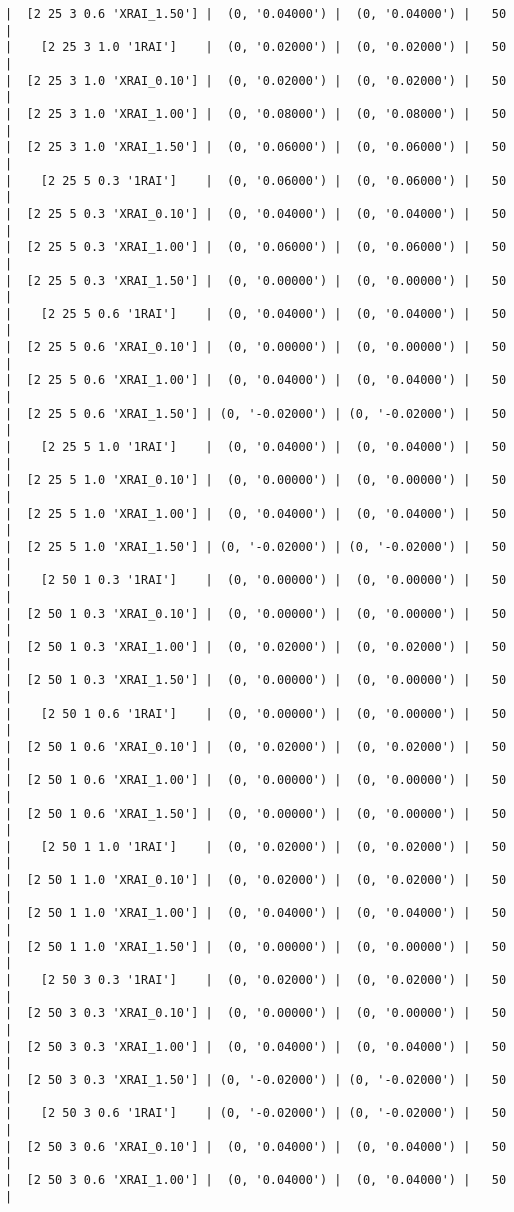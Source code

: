 \documentclass{article}
\begin{document}
\begin{verbatim}
|  [2 25 3 0.6 'XRAI_1.50'] |  (0, '0.04000') |  (0, '0.04000') |   50  |
|    [2 25 3 1.0 '1RAI']    |  (0, '0.02000') |  (0, '0.02000') |   50  |
|  [2 25 3 1.0 'XRAI_0.10'] |  (0, '0.02000') |  (0, '0.02000') |   50  |
|  [2 25 3 1.0 'XRAI_1.00'] |  (0, '0.08000') |  (0, '0.08000') |   50  |
|  [2 25 3 1.0 'XRAI_1.50'] |  (0, '0.06000') |  (0, '0.06000') |   50  |
|    [2 25 5 0.3 '1RAI']    |  (0, '0.06000') |  (0, '0.06000') |   50  |
|  [2 25 5 0.3 'XRAI_0.10'] |  (0, '0.04000') |  (0, '0.04000') |   50  |
|  [2 25 5 0.3 'XRAI_1.00'] |  (0, '0.06000') |  (0, '0.06000') |   50  |
|  [2 25 5 0.3 'XRAI_1.50'] |  (0, '0.00000') |  (0, '0.00000') |   50  |
|    [2 25 5 0.6 '1RAI']    |  (0, '0.04000') |  (0, '0.04000') |   50  |
|  [2 25 5 0.6 'XRAI_0.10'] |  (0, '0.00000') |  (0, '0.00000') |   50  |
|  [2 25 5 0.6 'XRAI_1.00'] |  (0, '0.04000') |  (0, '0.04000') |   50  |
|  [2 25 5 0.6 'XRAI_1.50'] | (0, '-0.02000') | (0, '-0.02000') |   50  |
|    [2 25 5 1.0 '1RAI']    |  (0, '0.04000') |  (0, '0.04000') |   50  |
|  [2 25 5 1.0 'XRAI_0.10'] |  (0, '0.00000') |  (0, '0.00000') |   50  |
|  [2 25 5 1.0 'XRAI_1.00'] |  (0, '0.04000') |  (0, '0.04000') |   50  |
|  [2 25 5 1.0 'XRAI_1.50'] | (0, '-0.02000') | (0, '-0.02000') |   50  |
|    [2 50 1 0.3 '1RAI']    |  (0, '0.00000') |  (0, '0.00000') |   50  |
|  [2 50 1 0.3 'XRAI_0.10'] |  (0, '0.00000') |  (0, '0.00000') |   50  |
|  [2 50 1 0.3 'XRAI_1.00'] |  (0, '0.02000') |  (0, '0.02000') |   50  |
|  [2 50 1 0.3 'XRAI_1.50'] |  (0, '0.00000') |  (0, '0.00000') |   50  |
|    [2 50 1 0.6 '1RAI']    |  (0, '0.00000') |  (0, '0.00000') |   50  |
|  [2 50 1 0.6 'XRAI_0.10'] |  (0, '0.02000') |  (0, '0.02000') |   50  |
|  [2 50 1 0.6 'XRAI_1.00'] |  (0, '0.00000') |  (0, '0.00000') |   50  |
|  [2 50 1 0.6 'XRAI_1.50'] |  (0, '0.00000') |  (0, '0.00000') |   50  |
|    [2 50 1 1.0 '1RAI']    |  (0, '0.02000') |  (0, '0.02000') |   50  |
|  [2 50 1 1.0 'XRAI_0.10'] |  (0, '0.02000') |  (0, '0.02000') |   50  |
|  [2 50 1 1.0 'XRAI_1.00'] |  (0, '0.04000') |  (0, '0.04000') |   50  |
|  [2 50 1 1.0 'XRAI_1.50'] |  (0, '0.00000') |  (0, '0.00000') |   50  |
|    [2 50 3 0.3 '1RAI']    |  (0, '0.02000') |  (0, '0.02000') |   50  |
|  [2 50 3 0.3 'XRAI_0.10'] |  (0, '0.00000') |  (0, '0.00000') |   50  |
|  [2 50 3 0.3 'XRAI_1.00'] |  (0, '0.04000') |  (0, '0.04000') |   50  |
|  [2 50 3 0.3 'XRAI_1.50'] | (0, '-0.02000') | (0, '-0.02000') |   50  |
|    [2 50 3 0.6 '1RAI']    | (0, '-0.02000') | (0, '-0.02000') |   50  |
|  [2 50 3 0.6 'XRAI_0.10'] |  (0, '0.04000') |  (0, '0.04000') |   50  |
|  [2 50 3 0.6 'XRAI_1.00'] |  (0, '0.04000') |  (0, '0.04000') |   50  |

\end{verbatim}
\end{document}
